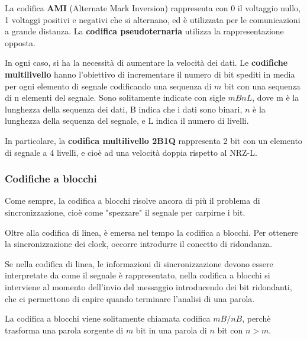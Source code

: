             \vspace{3mm}
            
            La codifica \textbf{AMI} (Alternate Mark Inversion) rappresenta con 0 il voltaggio nullo, 1 voltaggi positivi e negativi che si alternano, ed è utilizzata per le comunicazioni a grande distanza. La \textbf{codifica pseudoternaria} utilizza la rappresentazione opposta.
            
            \vspace{3mm}
            
            In ogni caso, si ha la necessità di aumentare la velocità dei dati. Le \textbf{codifiche multilivello} hanno l'obiettivo di incrementare il numero di bit spediti in media per ogni elemento di segnale codificando una sequenza di \(m\) bit con una sequenza di n elementi del segnale. Sono solitamente indicate con sigle \(mBnL\), dove m è la lunghezza della sequenza dei dati, B indica che i dati sono binari, \(n\) è la lunghezza della sequenza del segnale, e L indica il numero di livelli.
            
            \vspace{3mm}
            
            In particolare, la \textbf{codifica multilivello 2B1Q} rappresenta 2 bit con un elemento di segnale a 4 livelli, e cioè ad una velocità doppia rispetto al NRZ-L.
        
        \subsubsection{Codifiche a blocchi}
            
            Come sempre, la codifica a blocchi risolve ancora di più il problema di sincronizzazione, cioè come "spezzare" il segnale per carpirne i bit.
            
            Oltre alla codifica di linea, è emersa nel tempo la codifica a blocchi. Per ottenere la sincronizzazione dei clock, occorre introdurre il concetto di ridondanza. 
                
            Se nella codifica di linea, le informazioni di sincronizzazione devono essere interpretate da come il segnale è rappresentato, nella codifica a blocchi si interviene al momento dell'invio del messaggio introducendo dei bit ridondanti, che ci permettono di capire quando terminare l'analisi di una parola.
                
            La codifica a blocchi viene solitamente chiamata codifica \(mB/nB\), perchè trasforma una parola sorgente di \(m\) bit in una parola di \(n\) bit con \(n>m\). 
                
